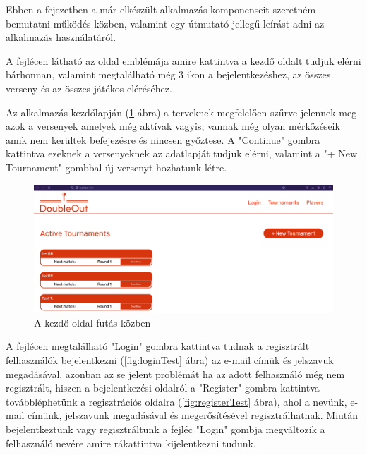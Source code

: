 
Ebben a fejezetben a már elkészült alkalmazás komponenseit szeretném bemutatni működés közben, valamint egy útmutató jellegű leírást adni az alkalmazás használatáról.\newline

A fejlécen látható az oldal emblémája amire kattintva a kezdő oldalt tudjuk elérni bárhonnan, valamint megtalálható még 3 ikon a bejelentkezéshez, az összes verseny és az összes játékos eléréséhez.\newline

Az alkalmazás kezdőlapján (\ref{fig:homeTest} ábra) a terveknek megfelelően szűrve jelennek meg azok a versenyek amelyek még aktívak vagyis, vannak még olyan mérkőzéseik amik nem kerültek befejezésre és nincsen győztese. A "Continue" gombra kattintva ezeknek a versenyeknek az adatlapját tudjuk elérni, valamint a "+ New Tournament" gombbal új versenyt hozhatunk létre.

\begin{figure}[h]
\centering
\includegraphics[scale=0.3]{images/HomeTest.png}
\caption{A kezdő oldal futás közben}
\label{fig:homeTest}
\end{figure}

A fejlécen megtalálható "Login" gombra kattintva tudnak a regisztrált felhasználók bejelentkezni (\ref{fig:loginTest} ábra) az e-mail címük és jelszavuk megadásával, azonban az se jelent problémát ha az adott felhasználó még nem regisztrált, hiszen a bejelentkezési oldalról a "Register" gombra kattintva továbbléphetünk a regisztrációs oldalra (\ref{fig:registerTest} ábra), ahol a nevünk, e-mail címünk, jelszavunk megadásával és megerősítésével regisztrálhatnak. Miután bejelentkeztünk vagy regisztráltunk a fejléc "Login" gombja megváltozik a felhasználó nevére amire rákattintva kijelentkezni tudunk.


